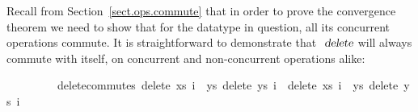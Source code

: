 Recall from Section~\ref{sect.ops.commute} that in order to prove the convergence theorem we need to show that for the datatype in question, all its concurrent operations commute.
It is straightforward to demonstrate that $\isa{delete}$ will always commute with itself, on concurrent and non-concurrent operations alike:
\vspace{0.35em}
\begin{isabellebody}
\ \ \ \ \ \ \ \ \ delete{\isacharunderscore}commutes{\isacharcolon}\ {\isachardoublequoteopen}delete\ xs\ i{}\ {\isasymbind}\ {\isacharparenleft}{\isasymlambda}ys{\isachardot}\ delete\ ys\ i{}{\isacharparenright}\ {\isacharequal}\ delete\ xs\ i{}\ {\isasymbind}\ {\isacharparenleft}{\isasymlambda}ys{\isachardot}\ delete\ ys\ i{}{\isacharparenright}{\isachardoublequoteclose}
\end{isabellebody}
\vspace{0.35em}

